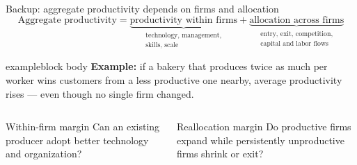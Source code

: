 \documentclass[10pt,aspectratio=169]{beamer}
\newcommand{\key}[1]{\textcolor{BrazilGreen}{\textbf{#1}}}
\begin{document}
\begin{frame}{Backup: aggregate productivity depends on firms and allocation}
  \[
    \text{Aggregate productivity}
    = \underbrace{\text{productivity within firms}}_{\substack{\text{technology, management,}\\\text{skills, scale}}}
    + \underbrace{\text{allocation across firms}}_{\substack{\text{entry, exit, competition,}\\\text{capital and labor flows}}}
  \]
  \vspace{.25cm}
  \begin{beamercolorbox}[rounded=true,sep=.6em,wd=\textwidth]{exampleblock body}
    \key{Example:} if a bakery that produces twice as much per worker wins customers from a less productive one nearby, average productivity rises --- even though no single firm changed.
  \end{beamercolorbox}
  \vspace{.25cm}
  \begin{columns}[T,onlytextwidth]
      \begin{block}{Within-firm margin}
        Can an existing producer adopt better technology and organization?
      \end{block}
      \begin{exampleblock}{Reallocation margin}
        Do productive firms expand while persistently unproductive firms shrink or exit?
      \end{exampleblock}
  \end{columns}
\end{frame}
\end{document}
